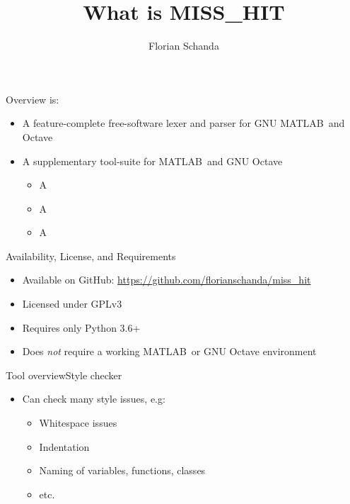 \documentclass{beamer}
\author{Florian Schanda}
\title{What is MISS\_HIT}
\begin{document}
\maketitle

{}

\begin{frame}{Overview}
   is:
  \begin{itemize}
  \item A feature-complete free-software lexer and parser for GNU MATLAB\texttrademark\ and Octave
    \pause
  \item A supplementary tool-suite for MATLAB\texttrademark\ and GNU
    Octave
    \begin{itemize}
    \item A 
    \item A 
    \item A 
    \end{itemize}
  \end{itemize}
\end{frame}

\begin{frame}{Availability, License, and Requirements}
  \begin{itemize}
  \item Available on GitHub: \url{https://github.com/florianschanda/miss_hit}
  \item Licensed under GPLv3
  \item Requires only Python 3.6+
  \item Does \emph{not} require a working MATLAB\texttrademark\ or GNU
    Octave environment
  \end{itemize}
\end{frame}

\begin{frame}{Tool overview}{Style checker}
  \begin{itemize}
  \item Can check many style issues, e.g:
    \begin{itemize}
    \item Whitespace issues
    \item Indentation
    \item Naming of variables, functions, classes
    \item etc.
    \end{itemize}
  \end{itemize}
\end{frame}
\end{document}
